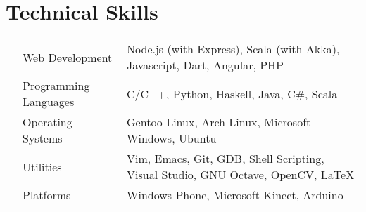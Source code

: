 \documentclass[11pt,a4paper]{moderncv}
\newcommand{\onepage}[1]{
  \ifdefined\onep
  #1
  \fi
}
\newcommand{\twopage}[1]{
  \ifdefined\twop
  #1
  \fi
}
\newcommand{\secspace}{
  \onepage{\vspace{-0.27cm}}
  \twopage{\vspace{-0.07cm}}
}
\newcommand{\secbelow}{
  \onepage{\vspace{-0.07cm}}
}
\begin{document}
\section*{Technical Skills}
\secbelow
\twopage{\bgroup{}}
\begin{tabular}{L{0.05cm} L{5cm} l}
  &Web Development 	          &Node.js (with Express), Scala (with
                                Akka), Javascript, Dart, Angular, PHP\\
  &Programming Languages      &C/C++, Python, Haskell, Java, C\#, Scala\\
  &Operating Systems	        &Gentoo Linux, Arch Linux, Microsoft Windows, Ubuntu\\
  &Utilities                  &Vim, Emacs, Git, GDB, Shell Scripting, Visual Studio, GNU Octave, OpenCV, \LaTeX\\
  &Platforms                  &Windows Phone, Microsoft Kinect, Arduino
\end{tabular}
\twopage{\egroup\newpage}

\secspace
\end{document}
